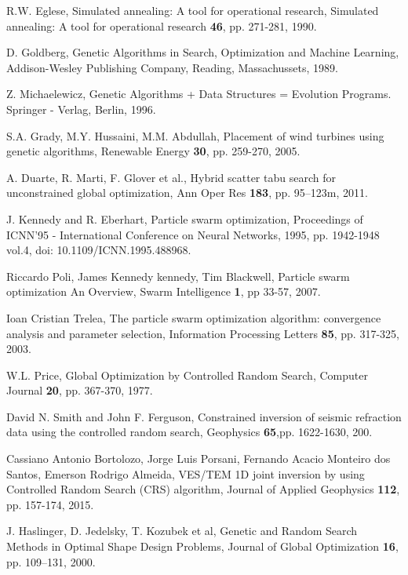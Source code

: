 \documentclass[symmetry,article,submit,moreauthors,pdftex]{Definitions/mdpi}
\begin{document}
\begin{thebibliography}{10}
R.W. Eglese, Simulated annealing: A tool for operational
research, Simulated annealing: A tool for operational research \textbf{46},
pp. 271-281, 1990.

D. Goldberg, Genetic Algorithms in Search, Optimization
and Machine Learning, Addison-Wesley Publishing Company, Reading,
Massachussets, 1989.

Z. Michaelewicz, Genetic Algorithms + Data Structures
= Evolution Programs. Springer - Verlag, Berlin, 1996.

S.A. Grady, M.Y. Hussaini, M.M. Abdullah, Placement
of wind turbines using genetic algorithms, Renewable Energy \textbf{30},
pp. 259-270, 2005.

A. Duarte, R. Marti, F. Glover et al., Hybrid scatter
tabu search for unconstrained global optimization, Ann Oper Res \textbf{183},
pp. 95--123m, 2011.

J. Kennedy and R. Eberhart, \textquotedbl Particle
swarm optimization,\textquotedbl{} Proceedings of ICNN'95 - International
Conference on Neural Networks, 1995, pp. 1942-1948 vol.4, doi: 10.1109/ICNN.1995.488968.

Riccardo Poli, James Kennedy kennedy, Tim Blackwell,
Particle swarm optimization An Overview, Swarm Intelligence \textbf{1},
pp 33-57, 2007. 

Ioan Cristian Trelea, The particle swarm optimization
algorithm: convergence analysis and parameter selection, Information
Processing Letters \textbf{85}, pp. 317-325, 2003.

W.L. Price, Global Optimization by Controlled Random
Search, Computer Journal \textbf{ 20}, pp. 367-370, 1977.

David N. Smith and John F. Ferguson, Constrained
inversion of seismic refraction data using the controlled random search,
Geophysics \textbf{65},pp. 1622-1630, 200.

Cassiano Antonio Bortolozo, Jorge Luis Porsani,
Fernando Acacio Monteiro dos Santos, Emerson Rodrigo Almeida, VES/TEM
1D joint inversion by using Controlled Random Search (CRS) algorithm,
Journal of Applied Geophysics \textbf{112}, pp. 157-174, 2015.

J. Haslinger, D. Jedelsky, T. Kozubek
et al, Genetic and Random Search Methods in Optimal Shape Design Problems,
Journal of Global Optimization \textbf{16}, pp. 109--131, 2000.


\end{thebibliography}
\end{document}
